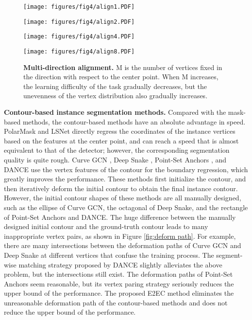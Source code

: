 \documentclass[10pt,twocolumn,letterpaper]{article}
\begin{document}
\begin{figure}[t]
\begin{minipage}[c]{0.25\linewidth}
\texttt{[image: figures/fig4/align1.PDF]}
\end{minipage}\hfill
\begin{minipage}[c]{0.25\linewidth}
\texttt{[image: figures/fig4/align2.PDF]}
\end{minipage}\hfill
\begin{minipage}[c]{0.25\linewidth}
\texttt{[image: figures/fig4/align4.PDF]}
\end{minipage}\hfill
\begin{minipage}[c]{0.25\linewidth}
\texttt{[image: figures/fig4/align8.PDF]}
\end{minipage}\hfill
\vspace{-3mm}
\caption{\textbf{Multi-direction alignment.} M is the number of vertices fixed in the direction with respect to the center point. When M increases, the learning difficulty of the task gradually decreases, but the unevenness of the vertex distribution also gradually increases.}\vspace{-5mm}
\label{fig:mda}
\end{figure}

\textbf{Contour-based instance segmentation methods.} Compared with the mask-based methods, the contour-based methods have an absolute advantage in speed. PolarMask \cite{polarmask} and LSNet \cite{lsnet} directly regress the coordinates of the instance vertices based on the features at the center point, and can reach a speed that is almost equivalent to that of the detector; however, the corresponding segmentation quality is quite rough. Curve GCN \cite{curvegcn}, Deep Snake \cite{deepsnake}, Point-Set Anchors \cite{pointset}, and DANCE \cite{dance} use the vertex features of the contour for the boundary regression, which greatly improves the performance. These methods first initialize the contour, and then iteratively deform the initial contour to obtain the final instance contour. However, the initial contour shapes of these methods are all manually designed, such as the ellipse of Curve GCN, the octagonal of Deep Snake, and the rectangle of Point-Set Anchors and DANCE. The huge difference between the manually designed initial contour and the ground-truth contour leads to many inappropriate vertex pairs, as shown in Figure \ref{fig:deform path}. For example, there are many intersections between the deformation paths of Curve GCN and Deep Snake at different vertices that confuse the training process. The segment-wise matching strategy proposed by DANCE slightly alleviates the above problem, but the intersections still exist. The deformation paths of Point-Set Anchors seem reasonable, but its vertex paring strategy seriously reduces the upper bound of the performance. The proposed E2EC method eliminates the unreasonable deformation path of the contour-based methods and does not reduce the upper bound of the performance.
\end{document}
